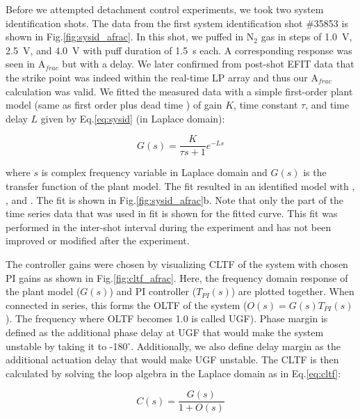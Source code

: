 \documentclass[10pt]{iopart}
\newcommand{\Afrac}{A$_{frac}$}
\begin{document}
Before we attempted detachment control experiments, we took two system identification shots.
The data from the first system identification shot \#35853 is shown in Fig.\ref{fig:sysid_afrac}.
In this shot, we puffed in N$_2$ gas in steps of 1.0~V, 2.5~V, and 4.0~V with puff duration of 1.5~s each.
A corresponding response was seen in \Afrac{} but with a delay.
We later confirmed from post-shot EFIT data that the strike point was indeed within the real-time \ac{LP} array and thus our \Afrac{} calculation was valid.
We fitted the measured data with a simple first-order plant model (same as first order plus dead time \cite{Eldon_2022_PPCF}) of gain $K$, time constant $\tau$, and time delay $L$ given by Eq.\ref{eq:sysid} (in Laplace domain):

\begin{equation}
 G(s) = \frac{K}{\tau s + 1}e^{-L s}
\label{eq:sysid}
\end{equation}

where $s$ is complex frequency variable in Laplace domain and $G(s)$ is the transfer function of the plant model.
The fit resulted in an identified model with \AfracK, \AfracTau, and \AfracL.
The fit is shown in Fig.\ref{fig:sysid_afrac}b.
Note that only the part of the time series data that was used in fit is shown for the fitted curve.
This fit was performed in the inter-shot interval during the experiment and has not been improved or modified after the experiment.

The controller gains were chosen by visualizing \ac{CLTF} of the system with chosen PI gains as shown in Fig.\ref{fig:cltf_afrac}.
Here, the frequency domain response of the plant model ($G(s)$) and PI controller ($T_{PI}(s)$) are plotted together.
When connected in series, this forms the \ac{OLTF} of the system ($O(s) = G(s) T_{PI}(s)$).
The frequency where \ac{OLTF} becomes 1.0 is called \ac{UGF}).
Phase margin is defined as the additional phase delay at \ac{UGF} that would make the system unstable by taking it to -180$^\circ$.
Additionally, we also define delay margin as the additional actuation delay that would make \ac{UGF} unstable.
The \ac{CLTF} is then calculated by solving the loop algebra in the Laplace domain as in Eq.\ref{eq:cltf}:

\begin{equation}
 C(s) = \frac{G(s)}{1 + O(s)}
\label{eq:cltf}
\end{equation}
\end{document}
